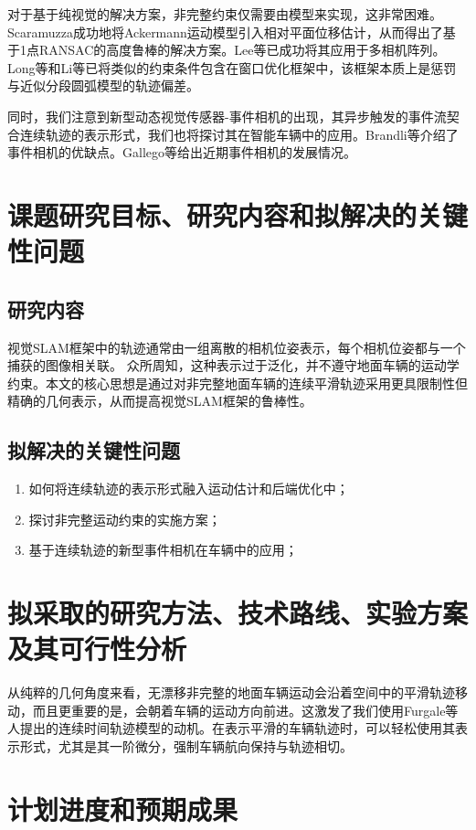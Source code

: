 对于基于纯视觉的解决方案，非完整约束仅需要由模型来实现，这非常困难。Scaramuzza\cite{scaramuzza2009real,scaramuzza2011}成功地将Ackermann运动模型引入相对平面位移估计，从而得出了基于1点RANSAC的高度鲁棒的解决方案。Lee等\cite{lee13}已成功将其应用于多相机阵列。 Long等\cite{zong2017vehicle}和Li等\cite{li18}已将类似的约束条件包含在窗口优化框架中，该框架本质上是惩罚与近似分段圆弧模型的轨迹偏差。

同时，我们注意到新型动态视觉传感器-事件相机的出现，其异步触发的事件流契合连续轨迹的表示形式，我们也将探讨其在智能车辆中的应用。Brandli等\cite{brandli2014240}介绍了事件相机的优缺点。Gallego等\cite{gallego2019event}给出近期事件相机的发展情况。

\section{课题研究目标、研究内容和拟解决的关键性问题}
\subsection{研究内容}
视觉SLAM框架中的轨迹通常由一组离散的相机位姿表示，每个相机位姿都与一个捕获的图像相关联。 众所周知，这种表示过于泛化，并不遵守地面车辆的运动学约束。本文的核心思想是通过对非完整地面车辆的连续平滑轨迹采用更具限制性但精确的几何表示，从而提高视觉SLAM框架的鲁棒性。
\subsection{拟解决的关键性问题}
\begin{enumerate}
    \item 如何将连续轨迹的表示形式融入运动估计和后端优化中；
    \item 探讨非完整运动约束的实施方案；
    \item 基于连续轨迹的新型事件相机在车辆中的应用；
\end{enumerate}

\section{拟采取的研究方法、技术路线、实验方案及其可行性分析}

从纯粹的几何角度来看，无漂移非完整的地面车辆运动会沿着空间中的平滑轨迹移动，而且更重要的是，会朝着车辆的运动方向前进。这激发了我们使用Furgale等人提出的连续时间轨迹模型的动机\cite{furgale2015continuous}。在表示平滑的车辆轨迹时，可以轻松使用其表示形式，尤其是其一阶微分，强制车辆航向保持与轨迹相切。

\section{计划进度和预期成果}

